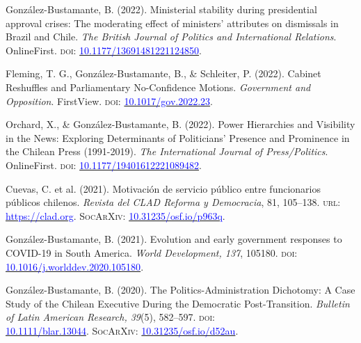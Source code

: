 \begin{publications}

\begin{benumerate}{9}

\item{González-Bustamante, B. (2022). Ministerial stability during presidential approval crises: The moderating effect of ministers' attributes on dismissals in Brazil and Chile. {\itshape The British Journal of Politics and International Relations}. OnlineFirst. {\scshape doi:} \href{https://doi.org/10.1177/13691481221124850}{\textcolor{blue}{10.1177/13691481221124850}}.}\vspace{1mm}

\item{Fleming, T. G., González-Bustamante, B., \& Schleiter, P. (2022). Cabinet Reshuffles and Parliamentary No-Confidence Motions. {\itshape Government and Opposition}. FirstView. {\scshape doi:} \href{https://doi.org/10.1017/gov.2022.23}{\textcolor{blue}{10.1017/gov.2022.23}}.}\vspace{1mm}

\item{Orchard, X., \& González-Bustamante, B. (2022). Power Hierarchies and Visibility in the News: Exploring Determinants of Politicians’ Presence and Prominence in the Chilean Press (1991-2019). {\itshape The International Journal of Press/Politics}. OnlineFirst. {\scshape doi:} \href{https://doi.org/10.1177/19401612221089482}{\textcolor{blue}{10.1177/19401612221089482}}.}

\item{\small Cuevas, C. et al. (2021). Motivación de servicio público entre funcionarios públicos chilenos. {\itshape Revista del CLAD Reforma y Democracia}, 81, 105--138. {\scshape url:} \href{https://clad.org/documentacion/revista-clad/articulos-publicados/081-noviembre-2021/}{\textcolor{blue}{https://clad.org}}. {\scshape \footnotesize SocArXiv:} \href{https://doi.org/10.31235/osf.io/p963q}{\textcolor{blue}{10.31235/osf.io/p963q}}.}\vspace{1mm}

\item{\small González-Bustamante, B. (2021). Evolution and early government responses to COVID-19 in South America. {\itshape World Development, 137}, 105180. {\scshape doi:} \href{https://doi.org/10.1016/j.worlddev.2020.105180}{\textcolor{blue}{10.1016/j.worlddev.2020.105180}}.}\vspace{1mm}

\item{\small González-Bustamante, B. (2020). The Politics-Administration Dichotomy: A Case Study of the Chilean Executive During the Democratic Post-Transition. {\itshape Bulletin of Latin American Research, 39}(5), 582--597. {\scshape doi}: \\ \href{https://doi.org/10.1111/blar.13044}{\textcolor{blue}{10.1111/blar.13044}}. {\scshape \footnotesize SocArXiv:} \href{https://doi.org/10.31235/osf.io/d52au}{\textcolor{blue}{10.31235/osf.io/d52au}}.}\vspace{1mm}


\end{benumerate}
\end{publications}
